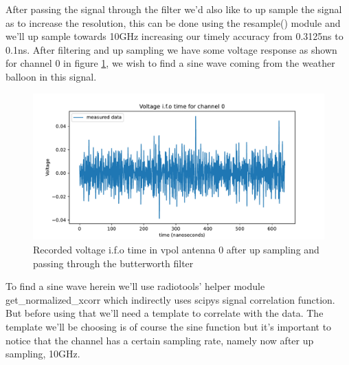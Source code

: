 After passing the signal through the filter we'd also like to up sample the
signal as to increase the resolution, this can be done using the resample()
module and we'll up sample towards 10GHz increasing our timely accuracy from
0.3125ns to 0.1ns.  After filtering and up sampling we have some voltage
response as shown for channel 0 in figure \ref{fig:VoltageAfterFilter}, we wish
to find a sine wave coming from the weather balloon in this signal.

\begin{figure}
	\centering
	\includegraphics[width=\textwidth]{figures/VoltageAfterFilter.pdf}
	\caption{Recorded voltage i.f.o time in vpol antenna 0 after up sampling and passing through the butterworth filter}
	\label{fig:VoltageAfterFilter}
\end{figure}

To find a sine wave herein we'll use radiotools' helper module get\_normalized\_xcorr
which indirectly uses scipys signal correlation function. But before using that we'll
need a template to correlate with the data. The template we'll be choosing is
of course the sine function but it's important to notice that the channel has a
certain sampling rate, namely now after up sampling, 10GHz. 

